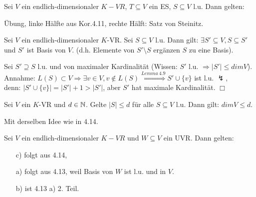 \begin{kor}
	Sei $V$ ein endlich-dimensionaler $K-VR$, $T\subseteq V$ ein ES, $S\subseteq V$ l.u. Dann gelten:
\end{kor}

\begin{bew}
	Übung, linke Hälfte aus Kor.4.11, rechte Hälft: Satz von Steinitz.
\end{bew}

\begin{satz}[Basisergänzungssatz]
	Sei $V$ ein endlich-dimensionaler $K$-VR. Sei $S\subseteq V$ l.u. Dann gilt: $\exists S' \subseteq V,S\subseteq S'$ und $S'$ ist Basis von $V$. (d.h. Elemente von $S'\setminus S$ ergänzen $S$ zu eine Basis).
\end{satz}

\begin{bew}
	Sei $S'\supseteq S$ l.u. und von maximaler Kardinalität (Wissen: $S'$ l.u. $\Rightarrow|S'|\leq dim V$). Annahme: $L(S)\subset V \Rightarrow \exists v\in V,v\notin L(S)\stackrel{Lemma\:4.9}{\Rightarrow}S'\cup\{v\}$ ist l.u. $\lightning$, \\
	denn: $|S'\cup \{v\}|=|S'|+1 > |S'|$, aber $S'$ hat maximale Kardinalität. \hfill $\Box$
\end{bew}

\begin{kor}
	Sei $V$ ein $K$-VR und $d\in\mathbb{N}$. Gelte $|S|\leq d$ für alle $S\subseteq V$ l.u. Dann gilt: $dim V\leq d$.
\end{kor}

\begin{bew}
	Mit derselben Idee wie in 4.14.
\end{bew}

\begin{kor}
	Sei $V$ ein endlich-dimensionaler $K-VR$ und $W\subseteq V$ ein UVR. Dann gelten:
\end{kor}

\begin{bew}
	\begin{itemize}
		\item[]
		\item[c)] folgt aus 4.14,
		\item[a)] folgt aus 4.13, weil Basis von $W$ ist l.u. und in $V$.
		\item[b)] ist 4.13 a) 2. Teil.
	\end{itemize}
\end{bew}

